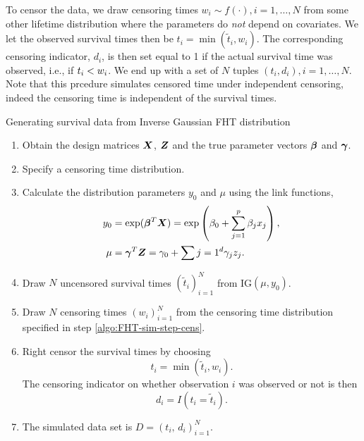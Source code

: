 To censor the data, we draw censoring times $w_i\sim f(\cdot),i=1,\ldots,N$ from some other lifetime distribution where the parameters do \textit{not} depend on covariates.
We let the observed survival times then be $t_i=\min(\tilde{t}_i,w_i)$.
The corresponding censoring indicator, $d_i$, is then set equal to 1 if the actual survival time was observed, i.e., if $t_{i}<w_i$.
We end up with a set of $N$ tuples $(t_i,d_i),i=1,\ldots,N$.
Note that this prcedure simulates censored time under independent censoring, indeed the censoring time is independent of the survival times.

\begin{algorithm}
\caption{Generating survival data from Inverse Gaussian FHT distribution}
\label{algo:FHT-sim}
\begin{enumerate}
    \item Obtain the design matrices $\bm{X}$, $\bm{Z}$ and the true parameter vectors $\boldsymbol{\beta}$ and $\boldsymbol{\gamma}$.
    \item\label{algo:FHT-sim-step-cens} Specify a censoring time distribution.
    \item Calculate the distribution parameters $y_0$ and $\mu$ using the link functions,
        \begin{align*}
            y_0&=\exp(\boldsymbol{\beta}^T\bm{X})=\exp\left(\beta_0+\sum_{j=1}^p\beta_jx_j\right), \\
            \mu&=\boldsymbol{\gamma}^T\bm{Z}=\gamma_0+\sum{j=1}^d\gamma_jz_j.
        \end{align*}
    \item Draw $N$ uncensored survival times $(\tilde{t}_i)_{i=1}^N$ from IG$(\mu,y_0)$.
    \item Draw $N$ censoring times $(w_i)_{i=1}^N$ from the censoring time distribution specified in step \ref{algo:FHT-sim-step-cens}.
    \item Right censor the survival times by choosing
            \begin{equation*}
                t_i=\min(\tilde{t}_i,w_i).
            \end{equation*}
          The censoring indicator on whether observation $i$ was observed or not is then
          \begin{equation*}
            d_i=I(t_i=\tilde{t}_i).
          \end{equation*}
    \item The simulated data set is $D=(t_i,\,d_i)_{i=1}^N$.
\end{enumerate}
\end{algorithm}

